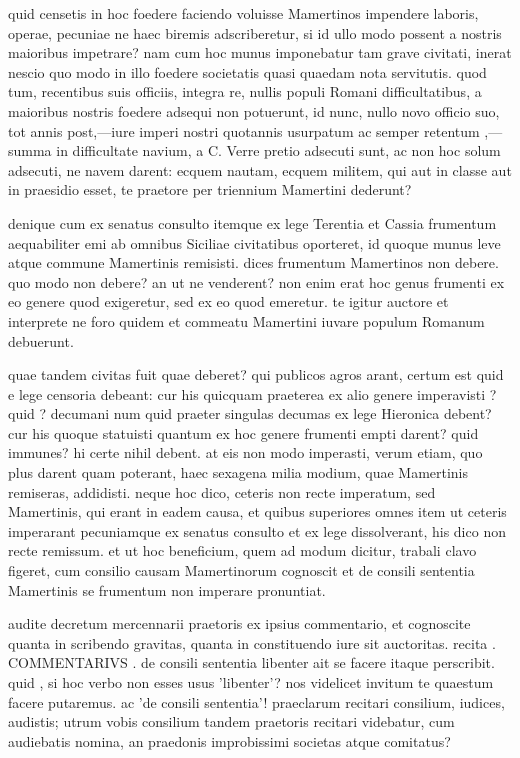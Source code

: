  quid censetis in hoc foedere faciendo voluisse Mamertinos impendere laboris, operae, pecuniae ne haec biremis adscriberetur, si id ullo modo possent a nostris maioribus impetrare? nam cum hoc munus imponebatur tam grave civitati, inerat nescio quo modo in illo foedere societatis quasi quaedam nota servitutis. quod tum, recentibus suis officiis, integra re, nullis populi Romani difficultatibus, a maioribus nostris foedere adsequi non potuerunt, id nunc, nullo novo officio suo, tot annis post,—iure imperi nostri quotannis usurpatum ac semper retentum ,—summa in difficultate navium, a C. Verre pretio adsecuti sunt, ac non hoc solum adsecuti, ne navem darent: ecquem nautam, ecquem militem, qui aut in classe aut in praesidio esset, te praetore per triennium Mamertini dederunt?

 denique cum ex senatus consulto itemque ex lege Terentia et Cassia frumentum aequabiliter emi ab omnibus Siciliae civitatibus oporteret, id quoque munus leve atque commune Mamertinis remisisti. dices frumentum Mamertinos non debere. quo modo non debere? an ut ne venderent? non enim erat hoc genus frumenti ex eo genere quod exigeretur, sed ex eo quod emeretur. te igitur auctore et interprete ne foro quidem et commeatu Mamertini iuvare populum Romanum debuerunt.

 quae tandem civitas fuit quae deberet? qui publicos agros arant, certum est quid e lege censoria debeant: cur his quicquam praeterea ex alio genere imperavisti ? quid ? decumani num quid praeter singulas decumas ex lege Hieronica debent? cur his quoque statuisti quantum ex hoc genere frumenti empti darent? quid immunes? hi certe nihil debent. at eis non modo imperasti, verum etiam, quo plus darent quam poterant, haec sexagena milia modium, quae Mamertinis remiseras, addidisti. neque hoc dico, ceteris non recte imperatum, sed Mamertinis, qui erant in eadem causa, et quibus superiores omnes item ut ceteris imperarant pecuniamque ex senatus consulto et ex lege dissolverant, his dico non recte remissum. et ut hoc beneficium, quem ad modum dicitur, trabali clavo figeret, cum consilio causam Mamertinorum cognoscit et de consili sententia Mamertinis se frumentum non imperare pronuntiat.

 audite decretum mercennarii praetoris ex ipsius commentario, et cognoscite quanta in scribendo gravitas, quanta in constituendo iure sit auctoritas. recita . COMMENTARIVS . de consili sententia libenter ait se facere itaque perscribit. quid , si hoc verbo non esses usus 'libenter'? nos videlicet invitum te quaestum facere putaremus. ac 'de consili sententia'! praeclarum recitari consilium, iudices, audistis; utrum vobis consilium tandem praetoris recitari videbatur, cum audiebatis nomina, an praedonis improbissimi societas atque comitatus?

